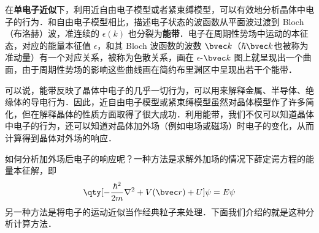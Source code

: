 
在\textbf{单电子近似}下，利用近自由电子模型或者紧束缚模型，可以有效地分析晶体中电子的行为．和自由电子模型相比，描述电子状态的波函数从平面波过渡到 Bloch （布洛赫）波，准连续的 $\epsilon(k)$ 也分裂为\textbf{能带}．电子在周期性势场中运动的本征态，对应的能量本征值 $\epsilon$，和其 Bloch 波函数的波数 $\bvec k$（$\hbar \bvec k$也被称为准动量）有一个对应关系，被称为色散关系，画在 $\epsilon$-${\bvec k}$ 图上就呈现出一个曲面，由于周期性势场的影响这些曲线画在简约布里渊区中呈现出若干个能带．

可以说，能带反映了晶体中电子的几乎一切行为，可以用来解释金属、半导体、绝缘体的导电行为．因此，近自由电子模型或紧束缚模型虽然对晶体模型作了许多简化，但在解释晶体的性质方面取得了很大成功．利用能带，我们不仅可以知道晶体中电子的行为，还可以知道对晶体加外场（例如电场或磁场）时电子的变化，从而计算得到晶体对外场的响应．

如何分析加外场后电子的响应呢？一种方法是求解外加场的情况下薛定谔方程的能量本征解，即
\begin{equation}
\qty[-\frac{\hbar^2}{2m}\nabla^2+V(\bvec r)+U]\psi = E\psi
\end{equation}
另一种方法是将电子的运动近似当作经典粒子来处理．下面我们介绍的就是这种分析计算方法．
